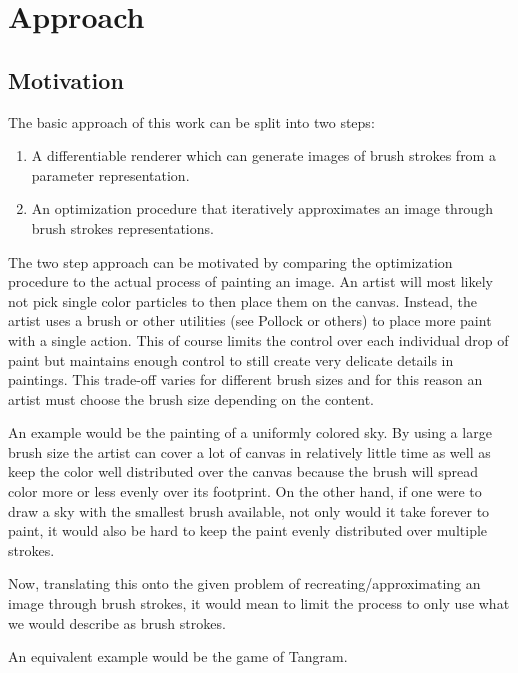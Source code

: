 \setchapterpreamble[u]{\margintoc}
\chapter{Approach}

\section{Motivation}

The basic approach of this work can be split into two steps:
\begin{enumerate}
    \item A differentiable renderer which can generate images of brush strokes from a parameter representation.
    \item An optimization procedure that iteratively approximates an image through brush strokes representations.
\end{enumerate}

The two step approach can be motivated by comparing the optimization procedure to the
actual process of painting an image.
An artist will most likely not pick single color particles to then place them on
the canvas.
Instead, the artist uses a brush or other utilities (see Pollock or others) to place
more paint with a single action.
This of course limits the control over each individual drop of paint but maintains
enough control to still create very delicate details in paintings.
This trade-off varies for different brush sizes and for this reason an artist must
choose the brush size depending on the content.

An example would be the painting of a uniformly colored sky.
By using a large brush size the artist can cover a lot of canvas in relatively little
time as well as keep the color well distributed over the canvas because the brush
will spread color more or less evenly over its footprint.
On the other hand, if one were to draw a sky with the smallest brush available,
not only would it take forever to paint, it would also be hard to keep the paint
evenly distributed over multiple strokes.

Now, translating this onto the given problem of recreating/approximating an image
through brush strokes, it would mean to limit the process to only use what we would
describe as brush strokes. 

An equivalent example would be the game of Tangram.

